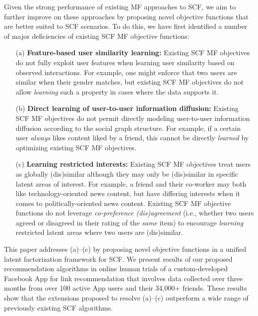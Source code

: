 Given the strong performance of existing MF approaches to SCF, we aim
to further improve on these approaches by proposing novel objective functions
that are better suited to SCF scenarios.
%
To do this, we
have first identified a number of major deficiencies of existing SCF MF
objective functions:
\begin{enumerate}
\item[(a)] {\bf Feature-based user similarity learning:} Existing SCF
MF objectives do not fully exploit user features when learning user
similarity based on observed interactions.  For example, one might 
enforce that two users are similar when their gender matches, but
existing SCF MF objectives do not allow \emph{learning} such a
property in cases where the data supports it.
\item[(b)] {\bf Direct learning of user-to-user information
diffusion:} Existing SCF MF objectives do not permit directly modeling
user-to-user information diffusion according to the social graph
structure.  For example, if a certain user \emph{always} likes content
liked by a friend, this cannot be directly \emph{learned}
by optimizing existing SCF MF objectives.
\item[(c)] {\bf Learning restricted interests:} Existing SCF MF
objectives treat users as globally (dis)similar although they may only
be (dis)similar in specific latent areas of interest.  For example, a
friend and their co-worker may both like technology-oriented news
content, but have differing interests when it comes to
politically-oriented news content.  Existing SCF MF objective
functions do not leverage \emph{co-preference 
(dis)agreement} (i.e., whether two users agreed or disagreed in their
rating of the \emph{same} item) to encourage \emph{learning} restricted
latent areas where two users are (dis)similar.
\end{enumerate}

This paper addresses (a)--(c) by proposing novel objective functions
in a unified latent factorization framework for SCF.  We present
results of our proposed recommendation algorithms in online human
trials of a custom-developed Facebook App for link recommendation that
involves data collected over three months from over 100 active App
users and their 34,000+ friends.  These results show that the
extensions proposed to resolve (a)--(c) outperform a wide range of
previously existing SCF algorithms.

